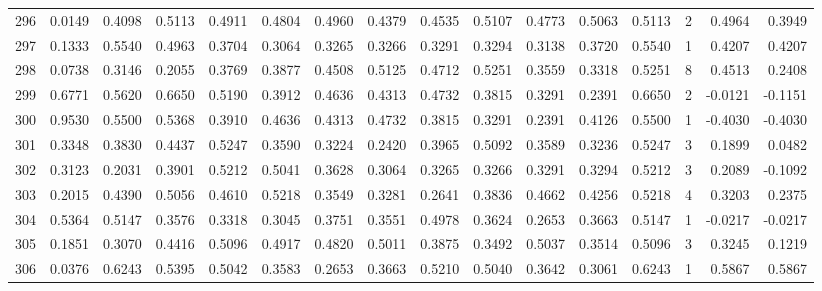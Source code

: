 \begin{tabular}{lrrrrrrrrrrrrrrr}
296 &      0.0149 &  0.4098 &  0.5113 &  0.4911 &  0.4804 &  0.4960 &  0.4379 &  0.4535 &  0.5107 &  0.4773 &   0.5063 &     0.5113 &      2 &                    0.4964 &                     0.3949 \\
297 &      0.1333 &  0.5540 &  0.4963 &  0.3704 &  0.3064 &  0.3265 &  0.3266 &  0.3291 &  0.3294 &  0.3138 &   0.3720 &     0.5540 &      1 &                    0.4207 &                     0.4207 \\
298 &      0.0738 &  0.3146 &  0.2055 &  0.3769 &  0.3877 &  0.4508 &  0.5125 &  0.4712 &  0.5251 &  0.3559 &   0.3318 &     0.5251 &      8 &                    0.4513 &                     0.2408 \\
299 &      0.6771 &  0.5620 &  0.6650 &  0.5190 &  0.3912 &  0.4636 &  0.4313 &  0.4732 &  0.3815 &  0.3291 &   0.2391 &     0.6650 &      2 &                   -0.0121 &                    -0.1151 \\
300 &      0.9530 &  0.5500 &  0.5368 &  0.3910 &  0.4636 &  0.4313 &  0.4732 &  0.3815 &  0.3291 &  0.2391 &   0.4126 &     0.5500 &      1 &                   -0.4030 &                    -0.4030 \\
301 &      0.3348 &  0.3830 &  0.4437 &  0.5247 &  0.3590 &  0.3224 &  0.2420 &  0.3965 &  0.5092 &  0.3589 &   0.3236 &     0.5247 &      3 &                    0.1899 &                     0.0482 \\
302 &      0.3123 &  0.2031 &  0.3901 &  0.5212 &  0.5041 &  0.3628 &  0.3064 &  0.3265 &  0.3266 &  0.3291 &   0.3294 &     0.5212 &      3 &                    0.2089 &                    -0.1092 \\
303 &      0.2015 &  0.4390 &  0.5056 &  0.4610 &  0.5218 &  0.3549 &  0.3281 &  0.2641 &  0.3836 &  0.4662 &   0.4256 &     0.5218 &      4 &                    0.3203 &                     0.2375 \\
304 &      0.5364 &  0.5147 &  0.3576 &  0.3318 &  0.3045 &  0.3751 &  0.3551 &  0.4978 &  0.3624 &  0.2653 &   0.3663 &     0.5147 &      1 &                   -0.0217 &                    -0.0217 \\
305 &      0.1851 &  0.3070 &  0.4416 &  0.5096 &  0.4917 &  0.4820 &  0.5011 &  0.3875 &  0.3492 &  0.5037 &   0.3514 &     0.5096 &      3 &                    0.3245 &                     0.1219 \\
306 &      0.0376 &  0.6243 &  0.5395 &  0.5042 &  0.3583 &  0.2653 &  0.3663 &  0.5210 &  0.5040 &  0.3642 &   0.3061 &     0.6243 &      1 &                    0.5867 &                     0.5867 \\

\end{tabular}
